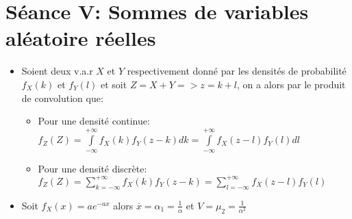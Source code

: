 \documentclass[a4paper,11pt]{report}
\begin{document}
\section{Séance V: Sommes de variables aléatoire réelles}
\begin{itemize}
	\item Soient deux v.a.r $X$ et $Y$ respectivement donné par les densités de probabilité $f_X(k)$ et $f_Y(l)$ et soit $Z = X+Y => z = k+l$, on a alors par le produit de convolution que:
	\begin{itemize}
		\item  Pour une densité continue:\\
		$f_Z(Z) = \int\limits_{-\infty}^{+\infty}{f_X(k)f_Y(z-k)dk} = \int\limits_{-\infty}^{+\infty}{f_X(z-l)f_Y(l)dl}$
		\item Pour une densité discrète:\\
		$f_Z(Z) = \sum\limits_{k=-\infty}^{+\infty}{f_X(k)f_Y(z-k)} = \sum\limits_{l=-\infty}^{+\infty}{f_X(z-l)f_Y(l)}$ 
	\end{itemize}
	\item Soit $f_X(x) = ae^{-ax}$ alors $\overline{x} = \alpha_1 = \frac{1}{\alpha}$ et $V = \mu_2 = \frac{1}{\alpha^2}$ 
\end{itemize}

\newpage
\end{document}
